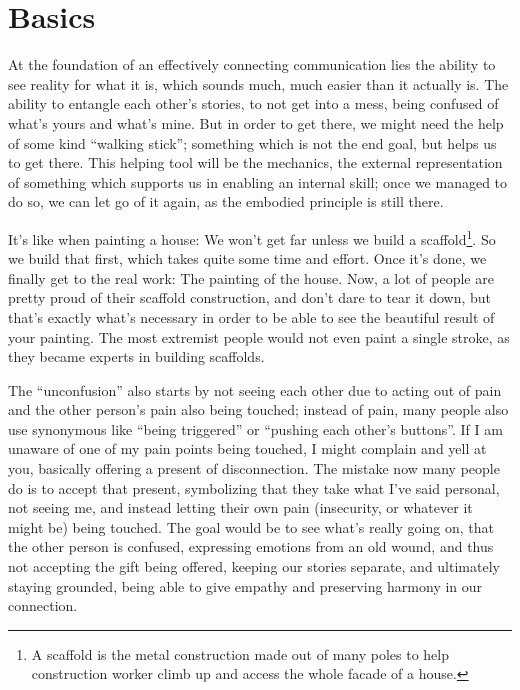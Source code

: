 \chapter{Basics}\label{ch:basics}


At the foundation of an effectively connecting communication lies the ability to see reality for what it is, which sounds much, much easier than it actually is.
The ability to entangle each other's stories, to not get into a mess, being confused of what's yours and what's mine.
But in order to get there, we might need the help of some kind ``walking stick''; something which is not the end goal, but helps us to get there.
This helping tool will be the mechanics, the external representation of something which supports us in enabling an internal skill; once we managed to do so, we can let go of it again, as the embodied principle is still there.

It's like when painting a house: We won't get far unless we build a scaffold\footnote{A scaffold is the metal construction made out of many poles to help construction worker climb up and access the whole facade of a house.}.
So we build that first, which takes quite some time and effort.
Once it's done, we finally get to the real work: The painting of the house.
Now, a lot of people are pretty proud of their scaffold construction, and don't dare to tear it down, but that's exactly what's necessary in order to be able to see the beautiful result of your painting.
The most extremist people would not even paint a single stroke, as they became experts in building scaffolds.

The ``unconfusion'' also starts by not seeing each other due to acting out of pain and the other person's pain also being touched; instead of pain, many people also use synonymous like ``being triggered'' or ``pushing each other's buttons''.
If I am unaware of one of my pain points being touched, I might complain and yell at you, basically offering a present of disconnection.
The mistake now many people do is to accept that present, symbolizing that they take what I've said personal, not seeing me, and instead letting their own pain (insecurity, or whatever it might be) being touched.
The goal would be to see what's really going on, that the other person is confused, expressing emotions from an old wound, and thus not accepting the gift being offered, keeping our stories separate, and ultimately staying grounded, being able to give empathy and preserving harmony in our connection.

